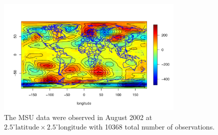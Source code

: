 
\begin{figure}[H]
\label{MSU_data}
\centering
\includegraphics [width=0.8\textwidth, keepaspectratio]{graphs/MSU_data.pdf}
\caption[The MSU data were observed in August 2002 at $2.5^\circ \mbox{latitude} \times 2.5^\circ \mbox{longitude}$]{The MSU data were observed in August 2002 at $2.5^\circ \mbox{latitude} \times 2.5^\circ \mbox{longitude}$ with 10368 total number of observations.}
\end{figure}

\vfill





